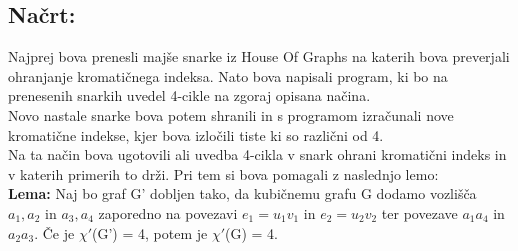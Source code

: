 \documentclass[a4paper,12pt]{article}
\begin{document}
\noindent \subsection*{Načrt:} Najprej bova prenesli majše snarke iz House Of Graphs na katerih bova preverjali ohranjanje kromatičnega indeksa.
Nato bova napisali program, ki bo na prenesenih snarkih uvedel 4-cikle na zgoraj opisana načina.\\
Novo nastale snarke bova potem shranili in s programom izračunali nove kromatične indekse, kjer bova izločili tiste ki so različni od 4.\\
Na ta način bova ugotovili ali uvedba 4-cikla v snark ohrani kromatični indeks in v katerih primerih to drži. Pri tem si bova pomagali z naslednjo lemo: \\

\noindent \textbf{Lema:} Naj bo graf G' dobljen tako, da kubičnemu grafu G dodamo vozlišča $a_1,a_2$ in $a_3,a_4$ zaporedno na povezavi $e_1 = u_1v_1$ in $e_2 = u_2v_2$
ter povezave $a_1a_4$ in $a_2a_3$. Če je $\chi'$(G') = 4, potem je $\chi'$(G) = 4.
\end{document}
